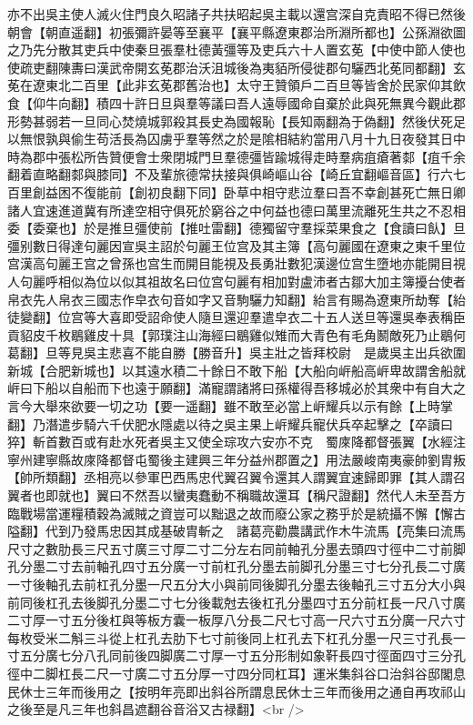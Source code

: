亦不出吳主使人滅火住門良久昭諸子共扶昭起吳主載以還宫深自克責昭不得已然後朝會【朝直遥翻】初張彌許晏等至襄平【襄平縣遼東郡治所淵所都也】公孫淵欲圖之乃先分散其吏兵中使秦旦張羣杜德黃彊等及吏兵六十人置玄莬【中使中節人使也使疏吏翻陳夀曰漢武帝開玄莬郡治沃沮城後為夷貊所侵徙郡句驪西北莬同都翻】玄莬在遼東北二百里【此非玄莬郡舊治也】太守王贊領戶二百旦等皆舍於民家仰其飲食【仰牛向翻】積四十許日旦與羣等議曰吾人遠辱國命自棄於此與死無異今觀此郡形勢甚弱若一旦同心焚燒城郭殺其長史為國報恥【長知兩翻為于偽翻】然後伏死足以無恨孰與偷生苟活長為囚虜乎羣等然之於是隂相結約當用八月十九日夜發其日中時為郡中張松所告贊便會士衆閉城門旦羣德彊皆踰城得走時羣病疽瘡著䣛【疽千余翻着直略翻䣛與膝同】不及輩旅德常扶接與俱崎嶇山谷【崎丘宜翻嶇音區】行六七百里創益困不復能前【創初良翻下同】卧草中相守悲泣羣曰吾不幸創甚死亡無日卿諸人宜速進道冀有所達空相守俱死於窮谷之中何益也德曰萬里流離死生共之不忍相委【委棄也】於是推旦彊使前【推吐雷翻】德獨留守羣採菜果食之【食讀曰飤】旦彊别數日得達句麗因宣吳主詔於句麗王位宫及其主簿【高句麗國在遼東之東千里位宫漢高句麗王宫之曾孫也宫生而開目能視及長勇壯數犯漢邊位宫生墮地亦能開目視人句麗呼相似為位以似其祖故名曰位宫句麗有相加對盧沛者古鄒大加主簿擾台使者帛衣先人帛衣三國志作皁衣句音如字又音駒驪力知翻】紿言有賜為遼東所劫奪【紿徒變翻】位宫等大喜即受詔命使人隨旦還迎羣遣皁衣二十五人送旦等還吳奉表稱臣貢貂皮千枚鶡雞皮十具【郭璞注山海經曰鶡雞似雉而大青色有毛角鬭敵死乃止鶡何葛翻】旦等見吳主悲喜不能自勝【勝音升】吳主壯之皆拜校尉　是歲吳主出兵欲圍新城【合肥新城也】以其遠水積二十餘日不敢下船【大船向㟁船高㟁卑故謂舍船就㟁曰下船以自船而下也遠于願翻】滿寵謂諸將曰孫權得吾移城必於其衆中有自大之言今大舉來欲要一切之功【要一遥翻】雖不敢至必當上㟁耀兵以示有餘【上時掌翻】乃潛遣步騎六千伏肥水隱處以待之吳主果上㟁耀兵寵伏兵卒起擊之【卒讀曰猝】斬首數百或有赴水死者吳主又使全琮攻六安亦不克　蜀庲降都督張翼【水經注寧州建寧縣故庲降都督屯蜀後主建興三年分益州郡置之】用法嚴峻南夷豪帥劉胄叛【帥所類翻】丞相亮以參軍巴西馬忠代翼召翼令還其人謂翼宜速歸即罪【其人謂召翼者也即就也】翼曰不然吾以蠻夷蠢動不稱職故還耳【稱尺證翻】然代人未至吾方臨戰場當運糧積穀為滅賊之資豈可以黜退之故而廢公家之務乎於是統攝不懈【懈古隘翻】代到乃發馬忠因其成基破胄斬之　諸葛亮勸農講武作木牛流馬【亮集曰流馬尺寸之數肋長三尺五寸廣三寸厚二寸二分左右同前軸孔分墨去頭四寸徑中二寸前脚孔分墨二寸去前軸孔四寸五分廣一寸前杠孔分墨去前脚孔分墨三寸七分孔長二寸廣一寸後軸孔去前杠孔分墨一尺五分大小與前同後脚孔分墨去後軸孔三寸五分大小與前同後杠孔去後脚孔分墨二寸七分後載尅去後杠孔分墨四寸五分前杠長一尺八寸廣二寸厚一寸五分後杠與等板方囊一板厚八分長二尺七寸高一尺六寸五分廣一尺六寸每枚受米二斛三斗從上杠孔去肋下七寸前後同上杠孔去下杠孔分墨一尺三寸孔長一寸五分廣七分八孔同前後四脚廣二寸厚一寸五分形制如象靬長四寸徑面四寸三分孔徑中二脚杠長二尺一寸廣二寸五分厚一寸四分同杠耳】運米集斜谷口治斜谷邸閣息民休士三年而後用之【按明年亮即出斜谷所謂息民休士三年而後用之通自再攻祁山之後至是凡三年也斜昌遮翻谷音浴又古禄翻】<br />
